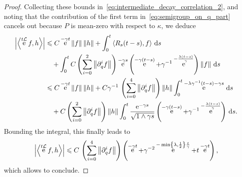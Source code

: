 \documentclass[11pt,a4paper]{article}
\DeclareMathOperator{\e}{e}
\renewcommand{\d}{\mathrm d}
\theoremstyle{plain}
\numberwithin{equation}{section}
\renewcommand{\leq}{\leqslant}
\begin{document}
\begin{proof}
    Collecting these bounds in~\eqref{eq:intermediate_decay_correlation_2},
    and noting that the contribution of the first term in~\eqref{eq:semigroup_on_q_part} cancels out because $P$ is mean-zero with respect to $\kappa$,
    we deduce
    \begin{align*}
        \label{eq:intermediate_decay_correlation_3}
        \abs{ \ip{\e^{t \mathcal L} f}{h}}
        &\leq C \e^{-\gamma t} \norm{f} \norm{h}
        + \int_{0}^t \ip{R_s(t-s)}{f} \, \d s \\
        &\quad + \int_{0}^t C \left( \sum_{i=0}^{2} \norm{\partial_q^i f} \right) \e^{-\gamma s}\left(\e^{-\gamma (t-s)} + \gamma^{-1} \e^{-\frac{\lambda(t-s)}{\gamma}} \right) \norm{f} \, \d s \\
        &\leq C \e^{-\gamma t} \norm{f} \norm{h}
        + C \gamma^{-1} \, \left( \sum_{i=0}^{4} \norm{\partial_q^i f} \right)  \norm{h} \int_{0}^{t}  \e^{-\lambda \gamma^{-1} (t-s) - \gamma s} \, \d s \\
        &\quad+ C \left( \sum_{i=0}^{2} \norm{\partial_q^i f} \right) \norm{h} \int_{0}^t \frac{\e^{-\gamma s}}{\sqrt{1 \wedge \gamma s}} \left(\e^{-\gamma (t-s)} + \gamma^{-1} \e^{-\frac{\lambda(t-s)}{\gamma}} \right) \, \d s.
    \end{align*}
    Bounding the integral, this finally leads to
    \begin{align*}
        \abs{ \ip{\e^{t \mathcal L} f}{h}}
        \leq C \, \left( \sum_{i=0}^{4} \norm{\partial_q^i f }\right)
        \left( \e^{-\gamma t} +  \gamma^{-2} \e^{-\min\left\{\lambda, \frac{1}{2}\right\} \frac{t}{\gamma}} + t\e^{-\gamma t} \right),
    \end{align*}
    which allows to conclude.
\end{proof}
\end{document}
